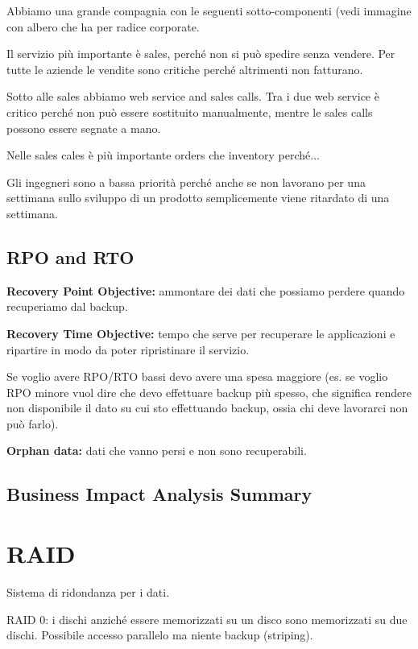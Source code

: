 Abbiamo una grande compagnia con le seguenti sotto-componenti (vedi immagine con albero che ha per radice corporate.

Il servizio più importante è sales, perché non si può spedire senza vendere. Per tutte le aziende le vendite sono critiche perché altrimenti non fatturano.

Sotto alle sales abbiamo web service and sales calls. Tra i due web service è critico perché non può essere sostituito manualmente, mentre le sales calls possono essere segnate a mano.

Nelle sales cales è più importante orders che inventory perché...

Gli ingegneri sono a bassa priorità perché anche se non lavorano per una settimana sullo sviluppo di un prodotto semplicemente viene ritardato di una settimana.

\subsection{RPO and RTO}

\textbf{Recovery Point Objective:} ammontare dei dati che possiamo perdere quando recuperiamo dal backup.

\textbf{Recovery Time Objective:} tempo che serve per recuperare le applicazioni e ripartire in modo da poter ripristinare il servizio.

Se voglio avere RPO/RTO bassi devo avere una spesa maggiore (es. se voglio RPO minore vuol dire che devo effettuare backup più spesso, che significa rendere non disponibile il dato su cui sto effettuando backup, ossia chi deve lavorarci non può farlo).

\textbf{Orphan data:} dati che vanno persi e non sono recuperabili.

\subsection{Business Impact Analysis Summary}


\section{RAID}

Sistema di ridondanza per i dati.

RAID 0: i dischi anziché essere memorizzati su un disco sono memorizzati su due dischi. Possibile accesso parallelo ma niente backup (striping).

